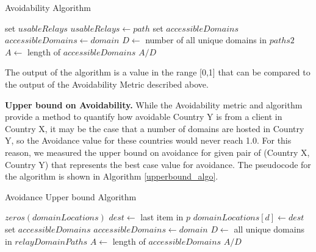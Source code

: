 \begin{algorithm}[t]
\caption{Avoidability Algorithm}
\label{avoid_algo}
\begin{algorithmic}[1]
    \State set $usableRelays$
		\State $usableRelays \gets path$
	\EndIf
    \EndFor
    \State set $accessibleDomains$
        \State $accessibleDomains \gets domain$
        \EndIf
    \EndIf
    \EndFor
    \State $D \gets$ number of all unique domains in $paths2$
    \State $A \gets$ length of $accessibleDomains$
    \State \Return $A / D$
\EndFunction
\end{algorithmic}
\end{algorithm}

The output of the algorithm is a value in the range [0,1] that can be compared to the output of the Avoidability Metric described above.  

{\bf Upper bound on Avoidability.}  While the Avoidability metric and algorithm provide a method to quantify how avoidable Country Y is from a client in Country X, it may be the case that a number of domains are hosted in Country Y, so the Avoidance value for these countries would never reach 1.0.  For this reason, we measured the upper bound on avoidance for given pair of (Country X, Country Y) that represents the best case value for avoidance.  The pseudocode for the algorithm is shown in Algorithm \ref{upperbound_algo}.

\begin{algorithm}[t]
\caption{Avoidance Upper bound Algorithm}
\label{upperbound_algo}
\begin{algorithmic}[1]
    \State $zeros(domainLocations)$
		\State $dest \gets $ last item in $p$
		\State $domainLocations[d] \gets dest$
    \EndFor
    \State set $accessibleDomains$
    \State $accessibleDomains \gets domain$
    \EndIf
    \EndFor
    \State $D \gets$ all unique domains in  $relayDomainPaths$
    \State $A \gets$ length of $accessibleDomains$
    \State \Return $A / D$
\EndFunction
\end{algorithmic}
\end{algorithm}

